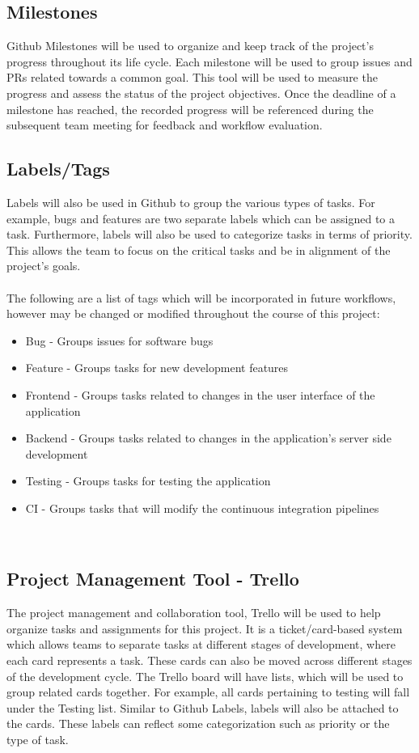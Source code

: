 \documentclass{article}
\begin{document}
\subsection{Milestones}
Github Milestones will be used to organize and keep track of the project’s progress throughout its life cycle. Each milestone will be used to group issues and PRs related towards a common goal. This tool will be used to measure the progress and assess the status of the project objectives. Once the deadline of a milestone has reached, the recorded progress will be referenced during the subsequent team meeting for feedback and workflow evaluation.

\subsection{Labels/Tags}
Labels will also be used in Github to group the various types of tasks. For example, bugs and features are two separate labels which can be assigned to a task. Furthermore, labels will also be used to categorize tasks in terms of priority. This allows the team to focus on the critical tasks  and be in alignment of the project’s goals. 
\\\\
The following are a list of tags which will be incorporated in future workflows, however may be changed or modified throughout the course of this project:

\begin{itemize}
	\item Bug - Groups issues for software bugs
        \item Feature - Groups tasks for new development features
        \item Frontend - Groups tasks related to changes in the user interface of the application
        \item Backend - Groups tasks related to changes in the application's server side development
        \item Testing - Groups tasks for testing the application
        \item CI - Groups tasks that will modify the continuous integration pipelines

\end{itemize}\\ 

\subsection{Project Management Tool - Trello}
The project management and collaboration tool, Trello will be used to help organize tasks and assignments for this project. It is a ticket/card-based system which allows teams to separate tasks at different stages of development, where each card represents a task. These cards can also be moved across different stages of the development cycle. The Trello board will have lists, which will be used to group related cards together. For example, all cards pertaining to testing will fall under the Testing list.  Similar to Github Labels, labels will also be attached to the cards. These labels can reflect some categorization such as priority or the type of task. 
\end{document}
